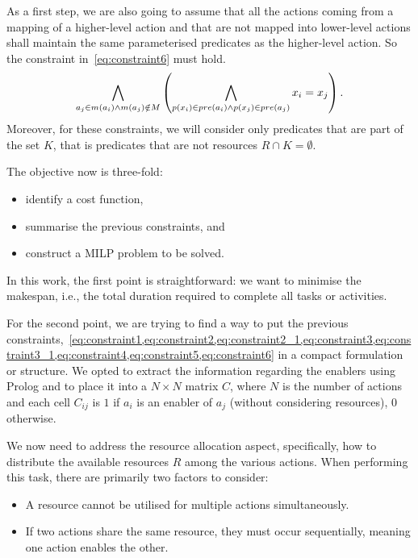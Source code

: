 As a first step, we are also going to assume that all the actions coming from a mapping of a higher-level action and that are not mapped into lower-level actions shall maintain the same parameterised predicates as the higher-level action. So the constraint in~\autoref{eq:constraint6} must hold.
\begin{equation}
    \label{eq:constraint6}
    \bigwedge_{a_j\in m(a_i) \wedge m(a_j)\notin M} \left(\bigwedge_{p(x_i) \in pre(a_i) \wedge p(x_j) \in pre(a_j)} x_i=x_j \right).
\end{equation}
Moreover, for these constraints, we will consider only predicates that are part of the set $K$, that is predicates that are not resources $R\cap K=\emptyset$.

The objective now is three-fold: 
\begin{itemize}
    \item identify a cost function,
    \item summarise the previous constraints, and
    \item construct a MILP problem to be solved.
\end{itemize}

In this work, the first point is straightforward: we want to minimise the makespan, i.e., the total duration required to complete all tasks or activities.

For the second point, we are trying to find a way to put the previous constraints,~\cref{eq:constraint1,eq:constraint2,eq:constraint2_1,eq:constraint3,eq:constraint3_1,eq:constraint4,eq:constraint5,eq:constraint6} in a compact formulation or structure. We opted to extract the information regarding the enablers using Prolog and to place it into a $N\times N$ matrix $C$, where $N$ is the number of actions and each cell $C_{ij}$ is $1$ if $a_i$ is an enabler of $a_j$ (without considering resources), 0 otherwise. 

We now need to address the resource allocation aspect, specifically, how to distribute the available resources $R$ among the various actions. When performing this task, there are primarily two factors to consider:
\begin{itemize}
    \item A resource cannot be utilised for multiple actions simultaneously.
    \item If two actions share the same resource, they must occur sequentially, meaning one action enables the other.
\end{itemize}


